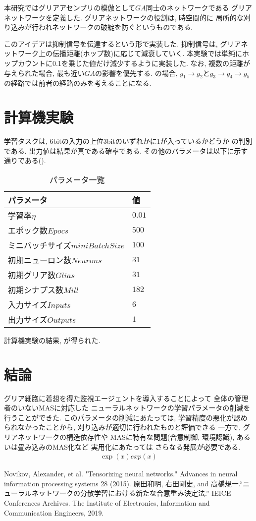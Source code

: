 \documentclass[a4paper,10.5pt,twocolumn]{jsarticle}
\begin{document}
本研究ではグリアアセンブリの模倣として$GA$同士のネットワークである
グリアネットワークを定義した.
グリアネットワークの役割は, 時空間的に
局所的な刈り込みが行われネットワークの破綻を防ぐというものである.

このアイデアは抑制信号を伝達するという形で実装した.
抑制信号は, グリアネットワーク上の伝播距離(ホップ数)に応じて減衰していく.
本実験では単純にホップカウントに0.1を乗じた値だけ減少するように実装した.
なお, 複数の距離が与えられた場合, 最も近い$GA$の影響を優先する.
の場合, $g_1\rightarrow g_2$と$g_3\rightarrow g_4 \rightarrow g_5$の経路では前者の経路のみを考えることになる.

\section{計算機実験}
学習タスクは, 6bitの入力の上位3bitのいずれかに1が入っているかどうか
の判別である. 出力値は結果が真である確率である. 
その他のパラメータは以下に示す通りである().
\begin{table}[H]
  \caption{パラメータ一覧}
  \label{tab:param}
  \centering
   \begin{tabular}{ll}
    \toprule
      パラメータ&値\\\midrule
      学習率$\eta$&$0.01$\\
      エポック数$Epocs$&$500$\\
      ミニバッチサイズ$miniBatchSize$&$100$\\
      初期ニューロン数$Neurons$&$31$\\
      初期グリア数$Glias$&$31$\\
      初期シナプス数$Mill$&$182$\\
      入力サイズ$Inputs$&$6$\\
      出力サイズ$Outputs$&$1$\\
    \bottomrule
   \end{tabular}
 \end{table}
計算機実験の結果, が得られた.


 
\section{結論}
グリア細胞に着想を得た監視エージェントを導入することによって
全体の管理者のいないMASに対応した
ニューラルネットワークの学習パラメータの削減を行うことができた.
このパラメータの削減にあたっては, 学習精度の悪化が認められなかったことから, 
刈り込みが適切に行われたものと評価できる
一方で, グリアネットワークの構造依存性や
MASに特有な問題(合意制御, 環境認識), あるいは畳み込みのMAS化など
実用化にあたっては
さらなる発展が必要である.
\begin{align}
  \exp(x) exp(x)
\end{align}
 \begin{thebibliography}{99}
  Novikov, Alexander, et al. "Tensorizing neural networks." Advances in neural information processing systems 28 (2015).
  原田和明, 右田剛史, and 高橋規一.``ニューラルネットワークの分散学習における新たな合意重み決定法.'' IEICE Conferences Archives. The Institute of Electronics, Information and Communication Engineers, 2019.
\end{thebibliography}
 
\end{document}
